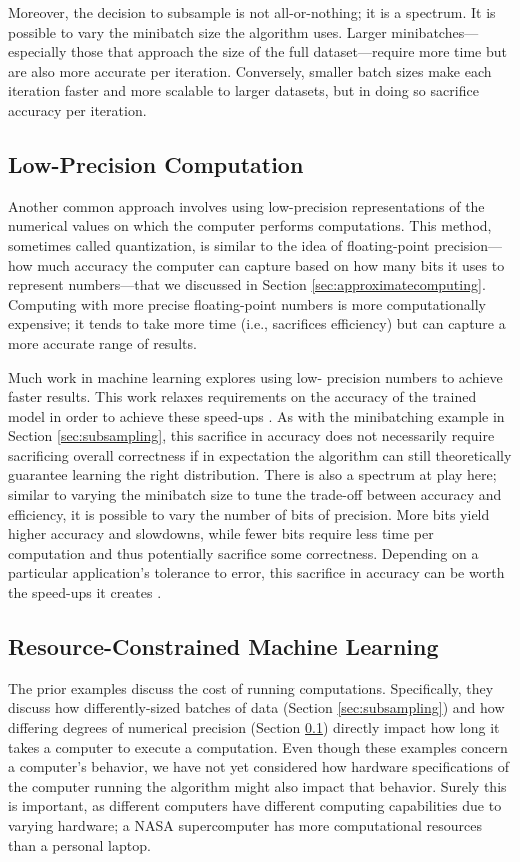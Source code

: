 \documentclass[sigplan,screen]{acmart}
\begin{document}
Moreover, the decision to subsample is not all-or-nothing; it is a spectrum. It is possible to vary the minibatch size the algorithm uses. Larger minibatches---especially those that approach the size of the full dataset---require more time but are also more accurate per iteration. Conversely, smaller batch sizes make each iteration faster and more scalable to larger datasets, but in doing so sacrifice accuracy per iteration.

\subsection{Low-Precision Computation} \label{sec:quantization}
Another common approach involves using low-precision representations of the numerical values on which the computer performs computations. This method, sometimes called quantization, is similar to the idea of floating-point precision---how much accuracy the computer can capture based on how many bits it uses to represent numbers---that we discussed in Section \ref{sec:approximatecomputing}. Computing with more precise floating-point numbers is more computationally expensive; it tends to take more time (i.e., sacrifices efficiency) but can capture a more accurate range of results.

Much work in machine learning explores using low- precision numbers to achieve faster results. This work relaxes requirements on the accuracy of the trained model in order to achieve these speed-ups \cite{desa2017async, gong2014quantize, courbariaux2015binaryconnect, alistarh2017qsgd, gupta2015lowprecision,han2015deep}. As with the minibatching example in Section \ref{sec:subsampling}, this sacrifice in accuracy does not necessarily require sacrificing overall correctness if in expectation the algorithm can still theoretically guarantee learning the right distribution. There is also a spectrum at play here; similar to varying the minibatch size to tune the trade-off between accuracy and efficiency, it is possible to vary the number of bits of precision. More bits yield higher accuracy and slowdowns, while fewer bits require less time per computation and thus potentially sacrifice some correctness. Depending on a particular application's tolerance to error, this sacrifice in accuracy can be worth the speed-ups it creates \cite{desa2018halp}.

\subsection{Resource-Constrained Machine Learning} \label{sec:resources}
The prior examples discuss the cost of running computations. Specifically, they discuss how differently-sized batches of data (Section \ref{sec:subsampling}) and how differing degrees of numerical precision (Section \ref{sec:quantization}) directly impact how long it takes a computer to execute a computation. Even though these examples concern a computer's behavior, we have not yet considered how hardware specifications of the computer running the algorithm might also impact that behavior. Surely this is important, as different computers have different computing capabilities due to varying hardware; a NASA supercomputer has more computational resources than a personal laptop.
\end{document}
